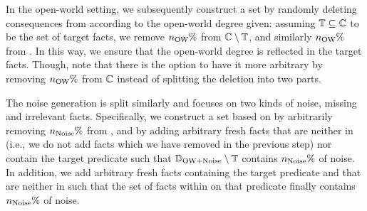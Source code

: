 In the open-world setting, we subsequently construct a set \dbowa by randomly deleting consequences from \db according to the open-world degree given: 
assuming $\mathbb{T}\subseteq\mathbb{C}$ to be the set of target facts, 
we remove $n_{\text{OW}}\%$ from $\mathbb{C}\setminus\mathbb{T}$, and similarly $n_{\text{OW}}\%$ from \tfacts.
In this way, we ensure that the open-world degree is reflected in the target facts. Though, note that there is the option to have it more arbitrary by removing $n_{\text{OW}}\%$ from $\mathbb{C}$ instead of splitting the deletion into two parts.

The noise generation is split similarly and focuses on two kinds of noise, missing and irrelevant facts. %
Specifically, we construct a set \dbowan based on \dbowa by arbitrarily removing $n_{\text{Noise}}\%$ from \sfacts, and by adding arbitrary fresh facts that are neither in \cfacts (i.e., we do not add facts which we have removed in the previous step) nor contain the target predicate
such that $\mathbb{D}_{\text{OW+Noise}}\setminus\mathbb{T}$ contains $n_{\text{Noise}}\%$ of noise.
In addition, we add arbitrary fresh facts containing the target predicate and that are neither in \tfacts %
such that the set of facts within \dbowan on that predicate finally contains $n_{\text{Noise}}\%$ of noise.

 


